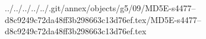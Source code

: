 ../../../../../.git/annex/objects/g5/09/MD5E-s4477--d8c9249c72da48ff3b298663c13d76ef.tex/MD5E-s4477--d8c9249c72da48ff3b298663c13d76ef.tex